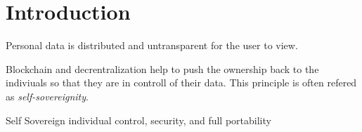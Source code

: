 \chapter{Introduction}
\label{cha:introduction}

Personal data is distributed and untransparent for the user to view.\cite[p. 1]{uPortWhitePaper}

Blockchain and decrentralization help to push the ownership back to the indiviuals so that they are in controll of their data. This principle is often refered as \textit{self-sovereignity}.\cite[p. 1]{uPortWhitePaper}


Self Sovereign individual control, security, and full portability
